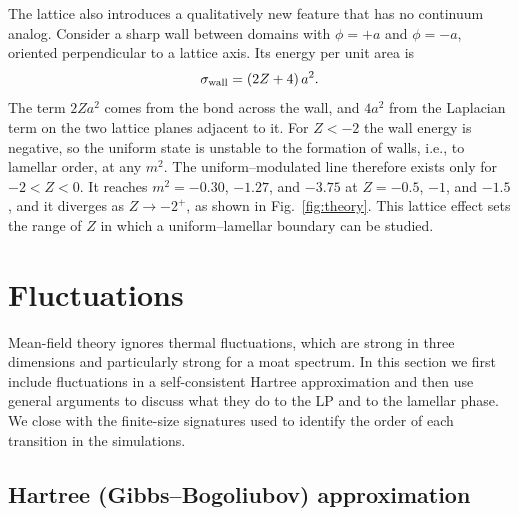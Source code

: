 \documentclass[aps,prd,twocolumn,superscriptaddress,nofootinbib,10pt]{revtex4-2}
\begin{document}
The lattice also introduces a qualitatively new feature that has no continuum
analog.  Consider a sharp wall between domains with $\phi=+a$ and $\phi=-a$,
oriented perpendicular to a lattice axis.  Its energy per unit area is
\begin{equation}
 \sigma_{\rm wall}=(2Z+4)\,a^2.
 \label{eq:wall}
\end{equation}
The term $2Za^2$ comes from the bond across the wall, and $4a^2$ from the
Laplacian term on the two lattice planes adjacent to it.  For $Z<-2$ the wall
energy is negative, so the uniform state is unstable to the formation of
walls, i.e., to lamellar order, at any $m^2$.  The uniform--modulated line
therefore exists only for $-2<Z<0$.  It reaches $m^2=-0.30$, $-1.27$, and
$-3.75$ at $Z=-0.5$, $-1$, and $-1.5$, and it diverges as $Z\to-2^+$, as
shown in Fig.~\ref{fig:theory}.  This lattice effect sets the range of $Z$ in
which a uniform--lamellar boundary can be studied.

\section{Fluctuations}
\label{sec:fluct}

Mean-field theory ignores thermal fluctuations, which are strong in three
dimensions and particularly strong for a moat spectrum.  In this section we
first include fluctuations in a self-consistent Hartree approximation and
then use general arguments to discuss what they do to the LP and to the
lamellar phase.  We close with the finite-size signatures used to identify
the order of each transition in the simulations.

\subsection{Hartree (Gibbs--Bogoliubov) approximation}
\end{document}
